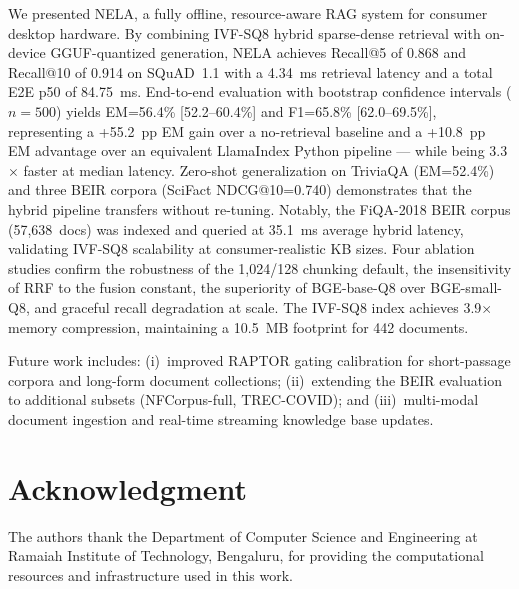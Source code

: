 \documentclass[conference]{IEEEtran}
\begin{document}
We presented NELA, a fully offline, resource-aware RAG system for consumer
desktop hardware. By combining IVF-SQ8 hybrid sparse-dense retrieval with
on-device GGUF-quantized generation, NELA achieves Recall@5 of 0.868 and
Recall@10 of 0.914 on SQuAD~1.1 with a 4.34~ms retrieval latency and a
total E2E p50 of 84.75~ms. End-to-end evaluation with bootstrap confidence
intervals ($n{=}500$) yields EM=56.4\% [52.2--60.4\%] and F1=65.8\%
[62.0--69.5\%], representing a +55.2~pp EM gain over a no-retrieval baseline
and a +10.8~pp EM advantage over an equivalent LlamaIndex Python pipeline —
while being 3.3$\times$ faster at median latency. Zero-shot generalization
on TriviaQA (EM=52.4\%) and three BEIR corpora (SciFact NDCG@10=0.740)
demonstrates that the hybrid pipeline transfers without re-tuning.
Notably, the FiQA-2018 BEIR corpus (57{,}638~docs) was indexed and queried
at 35.1~ms average hybrid latency, validating IVF-SQ8 scalability at
consumer-realistic KB sizes. Four
ablation studies confirm the robustness of the 1{,}024/128 chunking default,
the insensitivity of RRF to the fusion constant, the superiority of
BGE-base-Q8 over BGE-small-Q8, and graceful recall degradation at scale.
The IVF-SQ8 index achieves 3.9$\times$ memory compression, maintaining a
10.5~MB footprint for 442 documents.

Future work includes: (i)~improved RAPTOR gating calibration for
short-passage corpora and long-form document collections; (ii)~extending
the BEIR evaluation to additional subsets (NFCorpus-full, TREC-COVID); and
(iii)~multi-modal document ingestion and real-time streaming knowledge base
updates.

\section*{Acknowledgment}

The authors thank the Department of Computer Science and Engineering at
Ramaiah Institute of Technology, Bengaluru, for providing the computational
resources and infrastructure used in this work.
\end{document}
